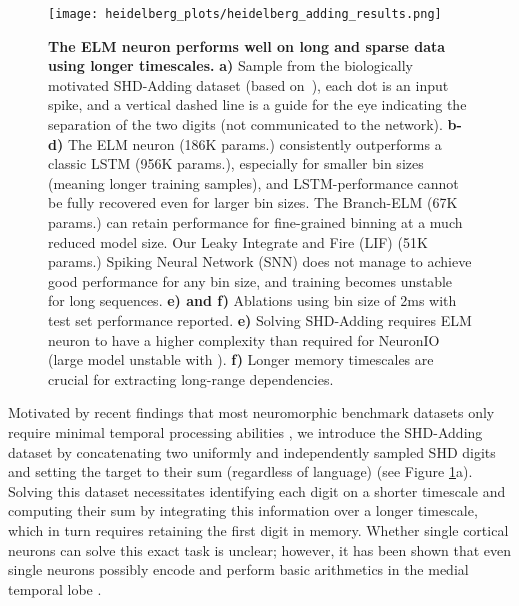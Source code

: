 \documentclass{article} \usepackage{iclr2024_doc_style,times}
\begin{document}
\begin{figure}[ht]
\centering
    \centering
    \texttt{[image: heidelberg\_plots/heidelberg\_adding\_results.png]}
    \caption{\textbf{The ELM neuron performs well on long and sparse data using longer timescales.} \textbf{a)} Sample from the biologically motivated SHD-Adding dataset (based on~\cite{cramer2020heidelberg}), each dot is an input spike, and a vertical dashed line is a guide for the eye indicating the separation of the two digits (not communicated to the network). \textbf{b-d)} The \textcolor{blueVar}{ELM} neuron (186K params.) consistently outperforms a classic \textcolor{orangeVar}{LSTM} (956K params.), especially for smaller bin sizes (meaning longer training samples), and LSTM-performance cannot be fully recovered even for larger bin sizes. The \textcolor{lightblueVar}{Branch-ELM} (67K params.) can retain performance for fine-grained binning at a much reduced model size. Our Leaky Integrate and Fire (LIF) (51K params.) \textcolor{redVar}{Spiking Neural Network} (\textcolor{redVar}{SNN}) does not manage to achieve good performance for any bin size, and training becomes unstable for long sequences. \textbf{e) and f)} Ablations using bin size of 2ms with test set performance reported. \textbf{e)} Solving SHD-Adding requires ELM neuron to have a higher complexity than required for NeuronIO (large model unstable with ). \textbf{f)} Longer memory timescales are crucial for extracting long-range dependencies.}
    \label{fig:heidelberg_results}
\end{figure}

Motivated by recent findings that most neuromorphic benchmark datasets only require minimal temporal processing abilities \cite{yang2021rethinking}, we introduce the SHD-Adding dataset by concatenating two uniformly and independently sampled SHD digits and setting the target to their sum (regardless of language) (see Figure \ref{fig:heidelberg_results}a). Solving this dataset necessitates identifying each digit on a shorter timescale and computing their sum by integrating this information over a longer timescale, which in turn requires retaining the first digit in memory. Whether single cortical neurons can solve this exact task is unclear; however, it has been shown that even single neurons possibly encode and perform basic arithmetics in the medial temporal lobe \cite{cantlon_basic_2007,kutter_single_2018,kutter_neuronal_2022}.
\end{document}
